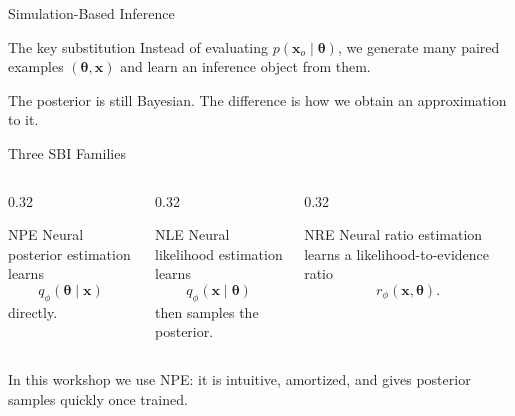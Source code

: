\documentclass[aspectratio=169,11pt]{beamer}
\begin{document}
\begin{frame}{Simulation-Based Inference}
  \begin{block}{The key substitution}
    Instead of evaluating $p(\bm{x}_o\mid\bm{\theta})$, we generate many
    paired examples $(\bm{\theta}, \bm{x})$ and learn an inference object
    from them.
  \end{block}


  \vspace{0.25cm}
  \small The posterior is still Bayesian. The difference is how we obtain an
  approximation to it.
\end{frame}

\begin{frame}{Three SBI Families}
  \begin{columns}[T,onlytextwidth]
    \begin{column}{0.32\textwidth}
      \begin{block}{NPE}
        \small Neural posterior estimation learns
        \[
          q_\phi(\bm{\theta}\mid\bm{x})
        \]
        directly.
      \end{block}
    \end{column}
    \begin{column}{0.32\textwidth}
      \begin{block}{NLE}
        \small Neural likelihood estimation learns
        \[
          q_\phi(\bm{x}\mid\bm{\theta})
        \]
        then samples the posterior.
      \end{block}
    \end{column}
    \begin{column}{0.32\textwidth}
      \begin{block}{NRE}
        \small Neural ratio estimation learns a likelihood-to-evidence ratio
        \[
          r_\phi(\bm{x},\bm{\theta}).
        \]
      \end{block}
    \end{column}
  \end{columns}

  \vspace{0.35cm}
  \small In this workshop we use \alert{NPE}: it is intuitive, amortized, and
  gives posterior samples quickly once trained.
\end{frame}
\end{document}
